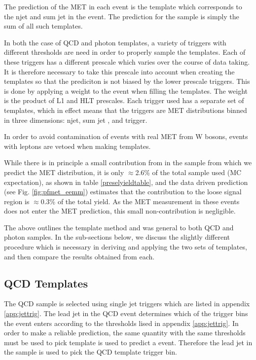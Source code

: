 The prediction of the MET in each \Z event is the template which corresponds to the njet and 
sum jet \pt in the \Z event. The prediction for the \Z sample is simply the sum of all such templates.

In both the case of QCD and photon templates, a variety of triggers with different \pt thresholds 
are need in order to properly sample the templates. Each of these triggers has a different prescale
which varies over the course of data taking. It is therefore necessary to take this prescale into
account when creating the templates so that the prediciton is not biased by the lower prescale 
triggers. This is done by applying a weight to the event when filling the templates. The weight 
is the product of L1 and HLT prescales. Each trigger used has a separate set of templates, which 
in effect means that the triggers are MET distributions binned in three dimensions: njet, 
sum jet \pt, and trigger.

In order to avoid contamination of events with real MET from W bosons, events with leptons 
are vetoed when making templates.

While there is in principle a small contribution from \ttbar in the \Z sample from 
which we predict the MET distribution, it is only $\approx$2.6\% of the total sample used
(MC expectation),
as shown in table \ref{preselyieldtable}, and the data driven prediction (see Fig. 
\ref{fig:pfmet_eemm}) estimates that the \ttbar contribution to the loose signal 
region is $\approx$0.3\% of the total \Z yield. As the MET measurement in these events 
does not enter the MET prediction, this small non-\Z contribution is negligible.

The above outlines the template method and was general to both QCD and photon samples. In the 
sub-sections below, we discuss the slightly different procedure which is necessary in deriving 
and applying the two sets of templates, and then compare the results obtained from each.


\subsection{QCD Templates}
\label{sec:templatesqcd}

The QCD sample is selected using single jet triggers which are listed in appendix \ref{app:jettrig}. 
The lead jet \pt in the QCD event determines which of the trigger bins the event enters according 
to the thresholds lised in appendix \ref{app:jettrig}. In order to make a reliable prediction, 
the same quantity with the same thresholds must be used to pick template is used to predict 
a \Z event. Therefore the lead jet \pt in the \Z sample is used to pick the QCD template trigger bin.

